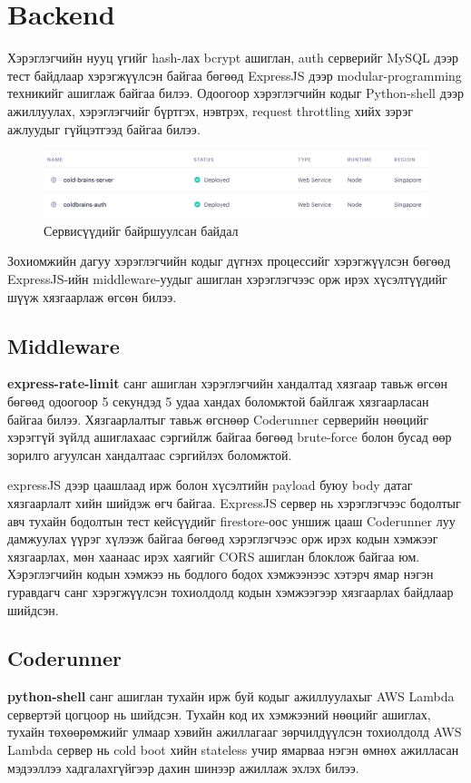 \clearpage
\section{Backend}
Хэрэглэгчийн нууц үгийг hash-лах bcrypt ашиглан, auth серверийг MySQL дээр тест байдлаар хэрэгжүүлсэн байгаа бөгөөд ExpressJS дээр modular-programming техникийг ашиглаж байгаа билээ. Одоогоор хэрэглэгчийн кодыг Python-shell дээр ажиллуулах, хэрэглэгчийг бүртгэх, нэвтрэх, request throttling хийх зэрэг ажлуудыг гүйцэтгээд байгаа билээ.

\begin{figure}[h]
  \centering
  \includegraphics[width=16cm]{img/render.com.png}
  \caption{Сервисүүдийг байршуулсан байдал}
\end{figure}

Зохиомжийн дагуу хэрэглэгчийн кодыг дүгнэх процессийг хэрэгжүүлсэн бөгөөд ExpressJS-ийн middleware-уудыг ашиглан хэрэглэгчээс орж ирэх хүсэлтүүдийг шүүж хязгаарлаж өгсөн билээ.

\subsection{Middleware}
\textbf{express-rate-limit} санг ашиглан хэрэглэгчийн хандалтад хязгаар тавьж өгсөн бөгөөд одоогоор 5 секундэд 5 удаа хандах боломжтой байлгаж хязгаарласан байгаа билээ. Хязгаарлалтыг тавьж өгснөөр Coderunner серверийн нөөцийг хэрэггүй зүйлд ашиглахаас сэргийлж байгаа бөгөөд brute-force болон бусад өөр зорилго агуулсан хандалтаас сэргийлэх боломжтой. 

expressJS дээр цаашлаад ирж болон хүсэлтийн payload буюу body датаг хязгаарлалт хийн шийдэж өгч байгаа. ExpressJS сервер нь хэрэглэгчээс бодолтыг авч тухайн бодолтын тест кейсүүдийг firestore-оос уншиж цааш Coderunner луу дамжуулах үүрэг хүлээж байгаа бөгөөд хэрэглэгчээс орж ирэх кодын хэмжээг хязгаарлах, мөн хаанаас ирэх хаягийг CORS ашиглан блоклож байгаа юм. Хэрэглэгчийн кодын хэмжээ нь бодлого бодох хэмжээнээс хэтэрч ямар нэгэн гуравдагч санг хэрэгжүүлсэн тохиолдолд кодын хэмжээгээр хязгаарлах байдлаар шийдсэн.

\subsection{Coderunner}
\textbf{python-shell} санг ашиглан тухайн ирж буй кодыг ажиллуулахыг AWS Lambda сервертэй цогцоор нь шийдсэн. Тухайн код их хэмжээний нөөцийг ашиглах, тухайн төхөөрөмжийг улмаар хэвийн ажиллагааг зөрчилдүүлсэн тохиолдолд AWS Lambda сервер нь cold boot хийн stateless учир ямарваа нэгэн өмнөх ажилласан мэдээллээ хадгалахгүйгээр дахин шинээр ажиллаж эхлэх билээ.


